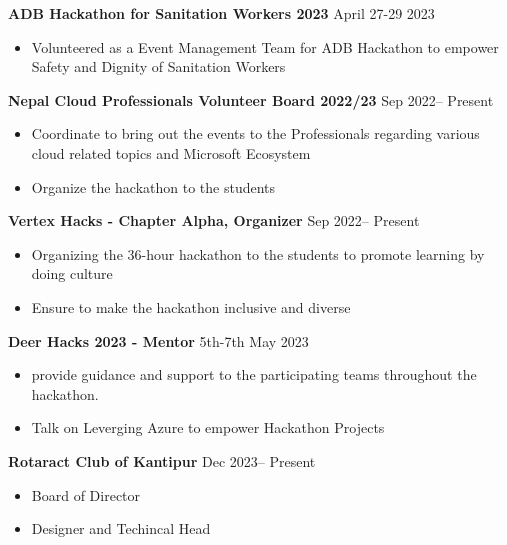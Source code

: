{\textbf{ADB Hackathon for Sanitation Workers 2023} \hfill April 27-29 2023}\par
\begin{itemize}
	\item Volunteered as a Event Management Team for ADB Hackathon to empower Safety and Dignity of Sanitation Workers    
\end{itemize}\par

{\textbf{Nepal Cloud Professionals Volunteer Board 2022/23} \hfill Sep 2022-- Present}\par
\begin{itemize}
	\item Coordinate to bring out the events to the Professionals regarding various cloud related topics and Microsoft Ecosystem

 	\item Organize the hackathon to the students
    
\end{itemize}\par

{\textbf{Vertex Hacks - Chapter Alpha, Organizer} \hfill Sep 2022-- Present}\par
\begin{itemize}
	\item Organizing the 36-hour hackathon to the students to promote learning by doing culture
        \item Ensure to make the hackathon inclusive and diverse
\end{itemize}\par

{\textbf{Deer Hacks 2023 - Mentor} \hfill 5th-7th May 2023}\par
\begin{itemize}
	\item provide guidance and support to the participating teams throughout the hackathon.
        \item Talk on Leverging Azure to empower Hackathon Projects
\end{itemize}\par

{\textbf{Rotaract Club of Kantipur} \hfill Dec 2023-- Present}\par
\begin{itemize}
	\item Board of Director
 \item Designer and Techincal Head
\end{itemize}\par

